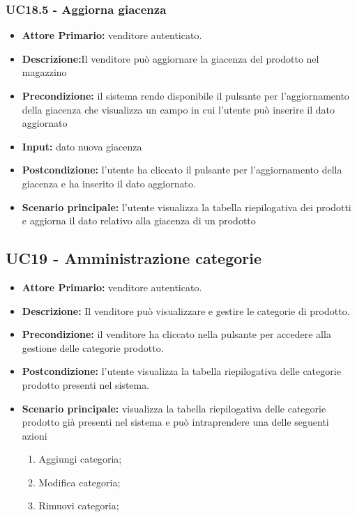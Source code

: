 \subsubsection{UC18.5 - Aggiorna giacenza}
\begin{itemize}
    \item \textbf{Attore Primario:}  venditore autenticato.
    \item \textbf{Descrizione:}Il venditore può aggiornare la giacenza del prodotto nel magazzino
    \item \textbf{Precondizione:} il sistema rende disponibile il pulsante per l’aggiornamento della giacenza che visualizza un campo in cui l’utente può inserire il dato aggiornato 
    \item \textbf{Input:} dato nuova giacenza
    \item \textbf{Postcondizione:} l’utente ha cliccato il pulsante per l’aggiornamento della giacenza e ha inserito il dato aggiornato. 
    \item \textbf{Scenario principale:} l’utente visualizza la tabella riepilogativa dei prodotti e aggiorna il dato relativo alla giacenza di un prodotto
   
\end{itemize}


\subsection{UC19 - Amministrazione categorie}
\begin{itemize}
    \item \textbf{Attore Primario:}  venditore autenticato.
    \item \textbf{Descrizione:}  Il venditore può visualizzare e gestire le categorie di prodotto.
    \item \textbf{Precondizione:}  il venditore ha cliccato nella pulsante per accedere alla gestione delle categorie prodotto.
    \item \textbf{Postcondizione:} l’utente visualizza la tabella riepilogativa delle categorie prodotto presenti nel sistema.
    \item \textbf{Scenario principale:} visualizza la tabella riepilogativa delle categorie prodotto già presenti nel sistema e può intraprendere una delle seguenti azioni
    \begin{enumerate}
        \item Aggiungi categoria;
        \item Modifica categoria;
        \item Rimuovi categoria;
    \end{enumerate}
\end{itemize}

